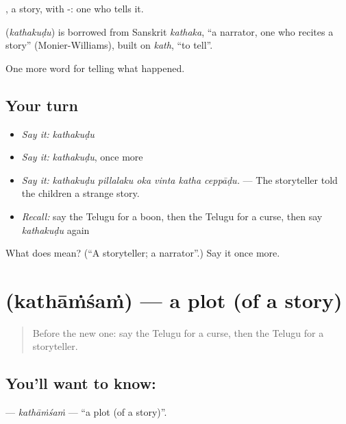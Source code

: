, a story, with -: one who tells it.

\begin{cousinweb}
\textbf{} (\emph{kathakuḍu}) is borrowed from Sanskrit \emph{kathaka}, \textquotedblleft{}a narrator, one who recites a story\textquotedblright{} (Monier-Williams), built on \emph{kath}, \textquotedblleft{}to tell\textquotedblright{}.
\end{cousinweb}

\begin{grammarlens}[title={What you've built}]
One more word for telling what happened.
\end{grammarlens}

\subsection*{Your turn}
\begin{itemize}
\raggedright
  \item \emph{Say it:} \emph{kathakuḍu}
  \item \emph{Say it:} \emph{kathakuḍu}, once more
  \item \emph{Say it:} \emph{kathakuḍu pillalaku oka vinta katha ceppāḍu.} — The storyteller told the children a strange story.
  \item \emph{Recall:} say the Telugu for a boon, then the Telugu for a curse, then say \emph{kathakuḍu} again
\end{itemize}

\begin{tcolorbox}[breakable,colback=teal!4,colframe=teal!35!black,title={Before you move on}]
What does  mean? (\textquotedblleft{}A storyteller; a narrator\textquotedblright{}.) Say it once more.
\end{tcolorbox}
\section[\texorpdfstring{\te{కథాంశం} (kathāṁśaṁ)}{కథాంశం (kathāṁśaṁ)}]{ (kathāṁśaṁ) — a plot (of a story)}

\label{lesson:TE-C372-kathamsam}



\begin{quote}
Before the new one: say the Telugu for a curse, then the Telugu for a storyteller.
\end{quote}

\subsection*{You'll want to know: }
\textbf{} — \emph{kathāṁśaṁ} — \textquotedblleft{}a plot (of a story)\textquotedblright{}.

